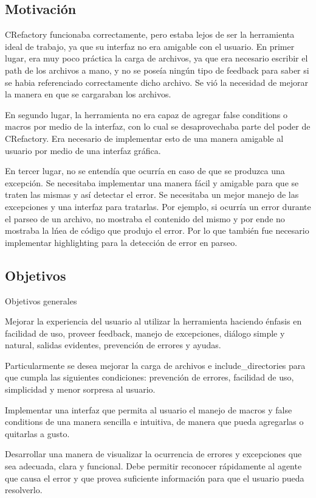 \documentclass[a4paper,oneside,12pt]{article}
\begin{document}
\subsection{Motivaci\'on}
CRefactory funcionaba correctamente, pero estaba lejos de ser la herramienta ideal de trabajo, ya que su interfaz no era amigable con el usuario. En primer lugar, era muy poco pr\'actica la carga de archivos, ya que era necesario escribir el path de los archivos a mano, y no se pose\'ia ning\'un tipo de feedback para saber si se habia referenciado correctamente dicho archivo. Se vi\'o la necesidad de mejorar la manera en que se cargaraban los archivos.

En segundo lugar, la herramienta no era capaz de agregar false conditions o macros por medio de la interfaz, con lo cual se desaprovechaba  parte del poder de CRefactory. Era necesario de implementar esto de una manera amigable al usuario por medio de una interfaz gr\'afica.

En tercer lugar, no se entend\'ia que ocurr\'ia en caso de que se produzca una excepci\'on. Se necesitaba implementar una manera f\'acil y amigable para que se traten las mismas y as\'i detectar el error. Se necesitaba un mejor manejo de las excepciones y una interfaz para tratarlas.
Por ejemplo, si ocurr\'ia un error durante el parseo de un archivo, no mostraba el contenido del mismo y por ende no mostraba la l\'nea de c\'odigo que produjo el error. Por lo que tambi\'en fue necesario implementar highlighting para la detecci\'on de error en parseo.


\subsection{Objetivos}
Objetivos generales

Mejorar la experiencia del usuario al utilizar la herramienta haciendo \'enfasis en facilidad de uso, proveer feedback, manejo de excepciones, di\'alogo simple y natural, salidas evidentes, prevenci\'on de errores y ayudas.

Particularmente se desea mejorar la carga de archivos e include\_directories para que cumpla las siguientes condiciones: prevenci\'on de errores, facilidad de uso, simplicidad y menor sorpresa al usuario.

Implementar una interfaz que permita al usuario el manejo de macros y false conditions de una manera sencilla e intuitiva, de manera que pueda agregarlas o quitarlas a gusto.

Desarrollar una manera de visualizar la ocurrencia de errores y excepciones que sea adecuada, clara y funcional. Debe permitir reconocer r\'apidamente al agente que causa el error y que provea suficiente informaci\'on para que el usuario pueda resolverlo.
\end{document}
